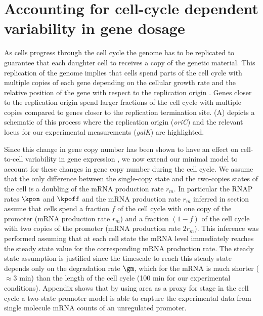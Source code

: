 \section{Accounting for cell-cycle dependent variability in gene dosage}

As cells progress through the cell cycle the genome has to be replicated to
guarantee that each daughter cell to receives a copy of the genetic material.
This replication of the genome implies that cells spend parts of the cell cycle
with multiple copies of each gene depending on the cellular growth rate and the
relative position of the gene with respect to the replication origin
\cite{Bremer1996}. Genes closer to the replication origin spend larger fractions
of the cell cycle with multiple copies compared to genes closer to the
replication termination site. (A) depicts a schematic of
this process where the replication origin ({\it oriC}) and the relevant locus
for our experimental measurements ({\it galK}) are highlighted.

Since this change in gene copy number has been shown to have an effect on
cell-to-cell variability in gene expression \cite{Jones2014a, Peterson2015}, we
now extend our minimal model to account for these changes in gene copy number
during the cell cycle.  We assume that the only difference between the
single-copy state and the two-copies states of the cell is a doubling of the
mRNA production rate $r_m$. In particular the RNAP rates $\kpon$ and $\kpoff$
and the mRNA production rate $r_m$ inferred in section 
assume that cells spend a fraction $f$ of the cell cycle  with one copy of the
promoter (mRNA production rate $r_m$) and a fraction $(1-f)$ of the cell cycle
with two copies of the promoter (mRNA production rate $2 r_m$). This inference
was performed assuming that at each cell state the mRNA level immediately
reaches the steady state value for the corresponding mRNA production rate. The
steady state assumption is justified since the timescale to reach this steady
state depends only on the degradation rate $\gm$, which for the mRNA  is much
shorter ($\approx 3$ min) than the length of the cell cycle (100 min for our
experimental conditions). Appendix 
shows that by using area as a proxy for stage in the cell cycle a two-state
promoter model is able to capture the experimental data from single molecule
mRNA counts of an unregulated promoter.

